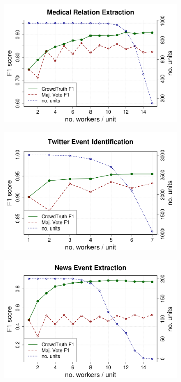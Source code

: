 \begin{figure}[!tb]
\centering
\centering
\begin{subfigure}{.5\textwidth}
\includegraphics[width=\linewidth]{img/medical_workf1_2.png}
\end{subfigure}%
\begin{subfigure}{.5\textwidth}
\includegraphics[width=\linewidth]{img/tweets_workf1_2.png}
\end{subfigure}
\begin{subfigure}{.5\textwidth}
\includegraphics[width=\linewidth]{img/events_workf1_2.png}

\end{subfigure}
\end{figure}
